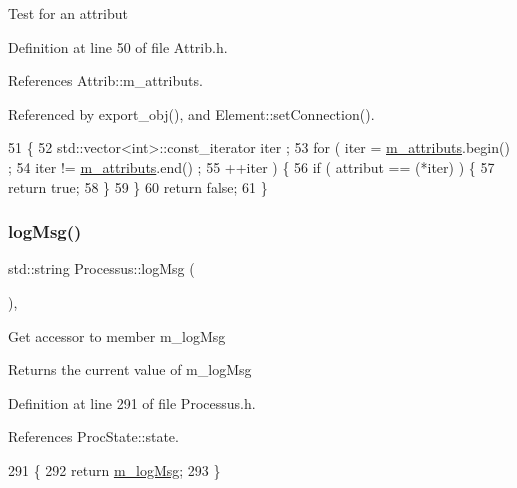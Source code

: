Test for an attribut 

Definition at line 50 of file Attrib.\+h.



References Attrib\+::m\+\_\+attributs.



Referenced by export\+\_\+obj(), and Element\+::set\+Connection().


\begin{DoxyCode}
51   \{
52     std::vector<int>::const\_iterator iter ;
53     \textcolor{keywordflow}{for} ( iter  = \hyperlink{classAttrib_ac4bd58a0cc6b38a3b711d609a3d3aacc}{m\_attributs}.begin() ;
54           iter != \hyperlink{classAttrib_ac4bd58a0cc6b38a3b711d609a3d3aacc}{m\_attributs}.end()   ;
55           ++iter ) \{
56       \textcolor{keywordflow}{if} ( attribut == (*iter) ) \{
57         \textcolor{keywordflow}{return} \textcolor{keyword}{true};
58       \}
59     \}
60     \textcolor{keywordflow}{return} \textcolor{keyword}{false};
61   \}
\end{DoxyCode}
\mbox{\label{classProcessus_a42fdeb17dc13ba854222666b6aa29b61}} 
\subsubsection{\texorpdfstring{log\+Msg()}{logMsg()}}
{\footnotesize\ttfamily std\+::string Processus\+::log\+Msg (\begin{DoxyParamCaption}{ }\end{DoxyParamCaption})\hspace{0.3cm}{\ttfamily [inline]}, {\ttfamily [inherited]}}

Get accessor to member m\+\_\+log\+Msg \begin{DoxyReturn}{Returns}
the current value of m\+\_\+log\+Msg 
\end{DoxyReturn}


Definition at line 291 of file Processus.\+h.



References Proc\+State\+::state.


\begin{DoxyCode}
291                       \{
292     \textcolor{keywordflow}{return} \hyperlink{classProcessus_a3bc0140a3a69a83951ab7f9986bd2c84}{m\_logMsg};
293   \}
\end{DoxyCode}
\mbox{\label{classRegisterTest_a5d3726a88a7fdcd90981bb5de8399df9}} 
